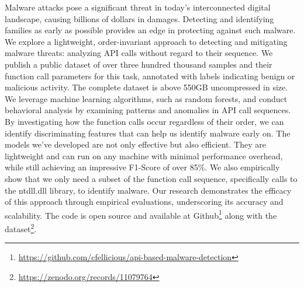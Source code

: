 Malware attacks pose a significant threat in today's interconnected digital landscape, causing billions of dollars in damages. Detecting and identifying families as early as possible provides an edge in protecting against such malware.
We explore a lightweight, order-invariant approach to detecting and mitigating malware threats: analyzing API calls without regard to their sequence.
We publish a public dataset of over three hundred thousand samples and their function call parameters for this task, annotated with labels indicating benign or malicious activity.
The complete dataset is above 550GB uncompressed in size.
We leverage machine learning algorithms, such as random forests, and conduct behavioral analysis by examining patterns and anomalies in API call sequences.
By investigating how the function calls occur regardless of their order, we can identify discriminating features that can help us identify malware early on.
The models we've developed are not only effective but also efficient. They are lightweight and can run on any machine with minimal performance overhead, while still achieving an impressive F1-Score of over 85\%.
We also empirically show that we only need a subset of the function call sequence, specifically calls to the ntdll.dll library, to identify malware.
Our research demonstrates the efficacy of this approach through empirical evaluations, underscoring its accuracy and scalability. 
The code is open source and available at Github\footnote{\url{https://github.com/cfellicious/api-based-malware-detection}} along with the dataset\footnote{\url{https://zenodo.org/records/11079764}}.
